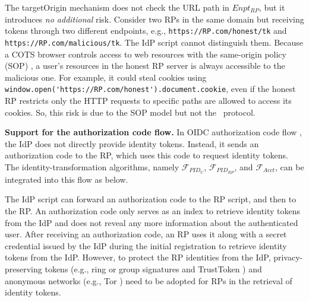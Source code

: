 The targetOrigin mechanism does not check the URL path in $Enpt_{RP}$, but it introduces {\em no additional} risk.
Consider two RPs in the same domain but receiving tokens through two different endpoints,
 e.g., \verb+https://RP.com/honest/tk+ and \verb+https://RP.com/malicious/tk+.
The IdP script cannot distinguish them.
%
%
Because a COTS browser controls access to web resources with the same-origin policy (SOP) \cite{sop},
    a user's resources in the honest RP server is always accessible to  the malicious one.
 For example, it could steal cookies using \verb+window.open('https://RP.com/honest').document.cookie+,
 even if the honest RP restricts only the HTTP requests to specific paths are allowed to access its cookies.
%
%
 So, this risk is due to the SOP model but not the \usso\ protocol.

\noindent \textbf{Support for the authorization code flow.} In OIDC authorization code flow \cite{OpenIDConnect}, the IdP does not directly provide identity tokens.
Instead, it sends an authorization code to the RP, which uses this code to request identity tokens. The identity-transformation algorithms, namely $\mathcal{F}_{PID_{U}}$, $\mathcal{F}_{PID_{RP}}$, and $\mathcal{F}_{Acct}$, can be integrated into this flow as below. %

The IdP script can forward an authorization code to the RP script, and then to the RP. %
An authorization code only serves as an index to retrieve identity tokens from the IdP and does not reveal any more information about the authenticated user.
After receiving an authorization code, an RP uses it along with a secret credential issued by the IdP during the initial registration \cite{OpenIDConnect} to retrieve identity tokens from the IdP. However, to protect the RP identities from the IdP, privacy-preserving tokens (e.g., ring or group signatures \cite{ring-sig,chaum1991group} and TrustToken \cite{trusttoken}) and anonymous networks (e.g., Tor \cite{tor}) need to be adopted for RPs in the retrieval of identity tokens.




